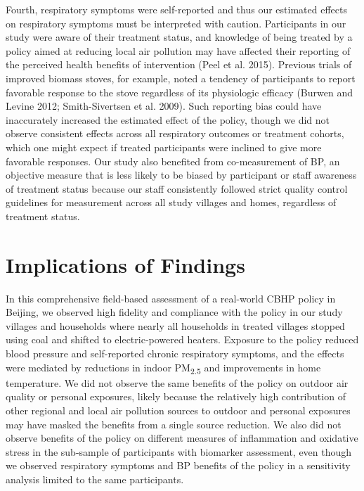 \documentclass[
  letterpaper,
  DIV=11,
  numbers=noendperiod]{scrartcl}
\begin{document}
Fourth, respiratory symptoms were self-reported and thus our estimated
effects on respiratory symptoms must be interpreted with caution.
Participants in our study were aware of their treatment status, and
knowledge of being treated by a policy aimed at reducing local air
pollution may have affected their reporting of the perceived health
benefits of intervention (Peel et al. 2015). Previous trials of improved
biomass stoves, for example, noted a tendency of participants to report
favorable response to the stove regardless of its physiologic efficacy
(Burwen and Levine 2012; Smith-Sivertsen et al. 2009). Such reporting
bias could have inaccurately increased the estimated effect of the
policy, though we did not observe consistent effects across all
respiratory outcomes or treatment cohorts, which one might expect if
treated participants were inclined to give more favorable responses. Our
study also benefited from co-measurement of BP, an objective measure
that is less likely to be biased by participant or staff awareness of
treatment status because our staff consistently followed strict quality
control guidelines for measurement across all study villages and homes,
regardless of treatment status.

\hypertarget{implications-of-findings}{%
\section{Implications of Findings}\label{implications-of-findings}}

In this comprehensive field-based assessment of a real-world CBHP policy
in Beijing, we observed high fidelity and compliance with the policy in
our study villages and households where nearly all households in treated
villages stopped using coal and shifted to electric-powered heaters.
Exposure to the policy reduced blood pressure and self-reported chronic
respiratory symptoms, and the effects were mediated by reductions in
indoor PM\textsubscript{2.5} and improvements in home temperature. We
did not observe the same benefits of the policy on outdoor air quality
or personal exposures, likely because the relatively high contribution
of other regional and local air pollution sources to outdoor and
personal exposures may have masked the benefits from a single source
reduction. We also did not observe benefits of the policy on different
measures of inflammation and oxidative stress in the sub-sample of
participants with biomarker assessment, even though we observed
respiratory symptoms and BP benefits of the policy in a sensitivity
analysis limited to the same participants.
\end{document}
